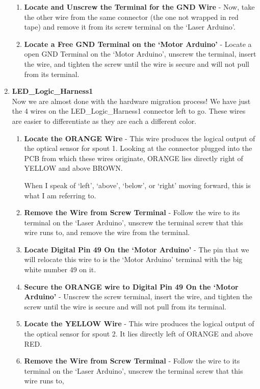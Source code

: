 \documentclass{article}
\begin{document}
\begin{enumerate}
\begin{enumerate}
            \item \textbf{Locate and Unscrew the Terminal for the GND Wire} - Now, take the other wire from the same connector (the one not wrapped in red tape) and remove it from its screw terminal on the `Laser Arduino'.
            \item \textbf{Locate a Free GND Terminal on the `Motor Arduino'} - Locate a open GND Terminal on the `Motor Arduino', unscrew the terminal, insert the wire, and tighten the screw until 
                the wire is secure and will not pull from its terminal.
        \end{enumerate}

    \item \textbf{LED\_Logic\_Harness1}\\
        Now we are almost done with the hardware migration process! We have just the 4 wires on the LED\_Logic\_Harness1 connector left to go. These wires are easier to 
        differentiate as they are each a different color.
        \begin{enumerate}
            \item \textbf{Locate the ORANGE Wire} - This wire produces the logical output of the optical sensor for spout 1. Looking at the connector plugged into the PCB from which these 
                wires originate, 
                ORANGE lies directly right of YELLOW and above BROWN. \par When I speak of `left', `above', `below', or `right' moving forward, this is what I am referring to.
            \item \textbf{Remove the Wire from Screw Terminal} - Follow the wire to its terminal on the `Laser Arduino', unscrew the terminal screw that this wire runs to, 
                and remove the wire from the terminal.
            \item \textbf{Locate Digital Pin 49 On the `Motor Arduino'} - The pin that we will relocate this wire to is the `Motor Arduino' terminal with the big white number 49 on it. 
            \item \textbf{Secure the ORANGE wire to Digital Pin 49 On the `Motor Arduino'} - Unscrew the screw terminal, insert the wire, and tighten the screw until the wire is secure
                and will not pull from its terminal.
            \item \textbf{Locate the YELLOW Wire} - This wire produces the logical output of the optical sensor for spout 2. It lies directly left of ORANGE and above RED.
            \item \textbf{Remove the Wire from Screw Terminal} - Follow the wire to its terminal on the `Laser Arduino', unscrew the terminal screw that this wire runs to, 

\end{enumerate}
\end{enumerate}
\end{document}
